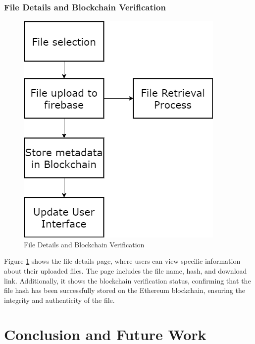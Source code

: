 \documentclass[12pt,a4paper]{report}
\begin{document}
\subsection{File Details and Blockchain Verification}
\begin{figure}[hbtp]
    \centering
    \includegraphics[scale=0.5]{./pic/dataflow.png}
    \caption{File Details and Blockchain Verification}
    \label{fig:filedetails}
\end{figure}
Figure \ref{fig:filedetails} shows the file details page, where users can view specific information about their uploaded files. The page includes the file name, hash, and download link. Additionally, it shows the blockchain verification status, confirming that the file hash has been successfully stored on the Ethereum blockchain, ensuring the integrity and authenticity of the file.


\chapter{Conclusion and Future Work}
\end{document}
